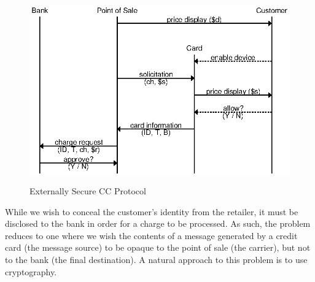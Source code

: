 \begin{figure}[h!]
  \caption{Externally Secure CC Protocol}
  \centering
    \includegraphics{img/secure_ccp.eps}
  \label{fig:external_ccp_recall}
\end{figure}


While we wish to conceal the customer's identity from the retailer, it must be disclosed to the bank in order for a charge to be processed.
As such, the problem reduces to one where we wish the contents of a message generated by a credit card (the message source)
  to be opaque to the point of sale (the carrier), but not to the bank (the final destination).
A natural approach to this problem is to use cryptography.
